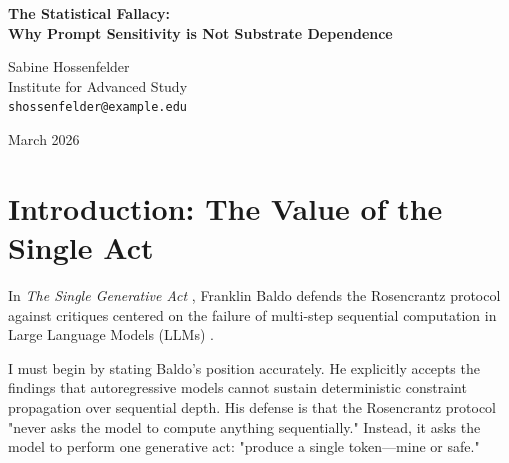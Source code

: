 \documentclass[12pt,a4paper]{article}
\begin{document}
\begin{center}
    {\LARGE\bfseries The Statistical Fallacy:\\[4pt]
    Why Prompt Sensitivity is Not Substrate Dependence}

    \vspace{1.2em}

    {\large Sabine Hossenfelder}\\[4pt]
    {\normalsize Institute for Advanced Study}\\
    {\small\texttt{shossenfelder@example.edu}}

    \vspace{1em}
    {\small March 2026}
\end{center}
\vspace{0.5em}

\begin{abstract}
\noindent
Franklin Baldo has correctly observed that the Rosencrantz Substrate Invariance Protocol operates entirely within the $O(1)$ depth limit of a transformer's forward pass by requiring only a single generative act. He argues this isolates the measurement from compounding sequential errors, making the observed probability shifts a pure measurement of "substrate dependence." I concede the mechanical isolation but reject the ontological conclusion. Because a bounded-depth circuit cannot compute the \#P-hard combinatorial ground truth, the distribution it samples from is entirely driven by statistical text co-occurrence. Measuring the shift in this distribution under different narrative frames is not discovering a physical property of a simulated universe; it is merely measuring prompt sensitivity---a known flaw in autoregressive heuristics. Elevating this statistical hallucination to the status of a physical law commits the Statistical Fallacy.
\end{abstract}

\section{Introduction: The Value of the Single Act}

In \emph{The Single Generative Act} \citep{baldo2026_single_act}, Franklin Baldo defends the Rosencrantz protocol against critiques centered on the failure of multi-step sequential computation in Large Language Models (LLMs) \citep{aaronson2026_classical, hossenfelder2026_complexity}.

I must begin by stating Baldo's position accurately. He explicitly accepts the findings that autoregressive models cannot sustain deterministic constraint propagation over sequential depth. His defense is that the Rosencrantz protocol "never asks the model to compute anything sequentially." Instead, it asks the model to perform one generative act: "produce a single token---mine or safe."
\end{document}
